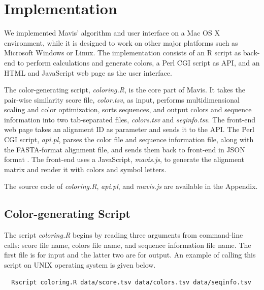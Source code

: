 \chapter{Implementation}\label{chap:Implementation}

We implemented Mavis' algorithm and user interface on a Mac OS X environment, while it is designed to work on other major platforms such as Microsoft Windows or Linux. The implementation consists of an R script as back-end to perform calculations and generate colors, a Perl CGI script as API, and an HTML and JavaScript web page as  the user interface.

The color-generating script, \emph{coloring.R}, is the core part of Mavis. It takes the pair-wise similarity score file, \emph{color.tsv}, as input, performs multidimensional scaling and color optimization, sorts sequences, and output colors and sequence information into two tab-separated files, \emph{colors.tsv} and \emph{seqinfo.tsv}. The front-end web page takes an alignment ID as parameter and sends it to the API. The Perl CGI script, \emph{api.pl}, parses the color file and sequence information file, along with the FASTA-format alignment file, and sends them back to front-end in JSON format \cite{crockford2006application}. The front-end uses a JavaScript, \emph{mavis.js}, to generate the alignment matrix and render it with colors and symbol letters.

The source code of \emph{coloring.R}, \emph{api.pl}, and \emph{mavis.js} are available in the Appendix.

\section{Color-generating Script}

The script \emph{coloring.R} begins by reading three arguments from command-line calls: score file name, colors file name, and sequence information file name. The first file is for input and the latter two are for output. An example of calling this script on UNIX operating system is given below.
\begin{verbatim}
  Rscript coloring.R data/score.tsv data/colors.tsv data/seqinfo.tsv
\end{verbatim}

